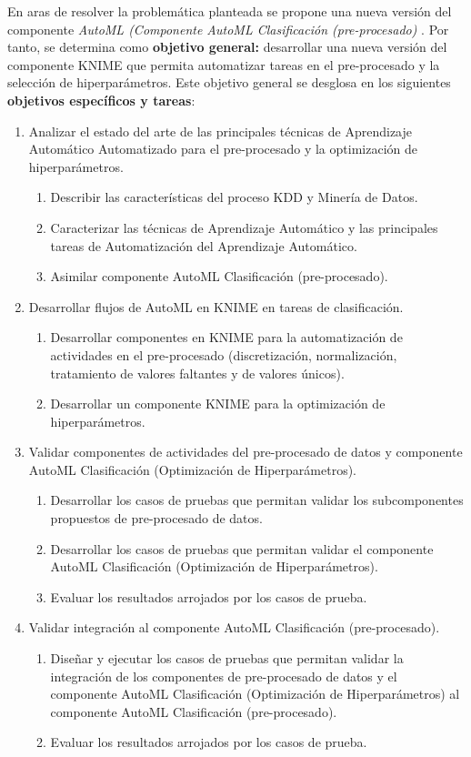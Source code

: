 En aras de resolver la problemática planteada se propone una nueva versión del componente \textit{AutoML (Componente AutoML Clasificación (pre-procesado)} \citep{Carrazana2022}. Por tanto, se determina como \textbf{objetivo general:} desarrollar una nueva versión del componente KNIME que permita automatizar tareas en el pre-procesado y la selección de hiperparámetros. Este objetivo general se desglosa en los siguientes \textbf{objetivos específicos y tareas}:

\begin{enumerate}
	\item Analizar el estado del arte de las principales técnicas de Aprendizaje Automático Automatizado para el pre-procesado y la optimización de hiperparámetros.
	\begin{enumerate}
		\item Describir las características del proceso KDD y Minería de Datos. 
		\item Caracterizar las técnicas de Aprendizaje Automático y las principales tareas de Automatización del Aprendizaje Automático.
		\item Asimilar componente AutoML Clasificación (pre-procesado).
	\end{enumerate}
	\item Desarrollar flujos de AutoML en KNIME en tareas de clasificación.
	\begin{enumerate}
		\item Desarrollar componentes en KNIME para la automatización de actividades en el pre-procesado (discretización, normalización, tratamiento de valores faltantes y de valores únicos).
		\item Desarrollar un componente KNIME para la optimización de hiperparámetros.
	\end{enumerate}
	\item Validar componentes de actividades del pre-procesado de datos y componente AutoML Clasificación (Optimización de Hiperparámetros).
	\begin{enumerate}
		\item Desarrollar los casos de pruebas que permitan validar los subcomponentes propuestos de pre-procesado de datos. 
		\item Desarrollar los casos de pruebas que permitan validar el componente AutoML Clasificación (Optimización de Hiperparámetros).
		\item Evaluar los resultados arrojados por los casos de prueba.
	\end{enumerate} 
	\item Validar integración al componente AutoML Clasificación (pre-procesado).
	\begin{enumerate}
		\item Diseñar y ejecutar los casos de pruebas que permitan validar la integración de los componentes de pre-procesado de datos y el componente AutoML Clasificación (Optimización de Hiperparámetros) al componente AutoML Clasificación (pre-procesado).
		\item Evaluar los resultados arrojados por los casos de prueba.
	\end{enumerate}
\end{enumerate}

